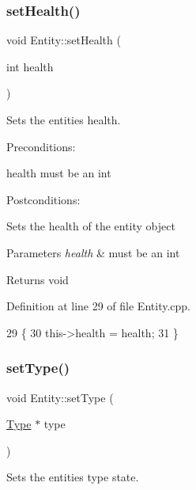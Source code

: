 \subsubsection{\texorpdfstring{set\+Health()}{setHealth()}}
{\footnotesize\ttfamily void Entity\+::set\+Health (\begin{DoxyParamCaption}\item[{int}]{health }\end{DoxyParamCaption})}



Sets the entities health. 

Preconditions\+:
\begin{DoxyItemize}
\item health must be an int
\end{DoxyItemize}

Postconditions\+:
\begin{DoxyItemize}
\item Sets the health of the entity object
\end{DoxyItemize}


\begin{DoxyParams}{Parameters}
{\em health} & must be an int \\
\hline
\end{DoxyParams}
\begin{DoxyReturn}{Returns}
void 
\end{DoxyReturn}


Definition at line 29 of file Entity.\+cpp.


\begin{DoxyCode}
29                                  \{
30     this->health = health;
31 \}
\end{DoxyCode}
\mbox{\label{classEntity_a5d04ce64c9ca214900422865e298e36c}} 
\subsubsection{\texorpdfstring{set\+Type()}{setType()}}
{\footnotesize\ttfamily void Entity\+::set\+Type (\begin{DoxyParamCaption}\item[{\hyperlink{classType}{Type} $\ast$}]{type }\end{DoxyParamCaption})}



Sets the entities type state. 


